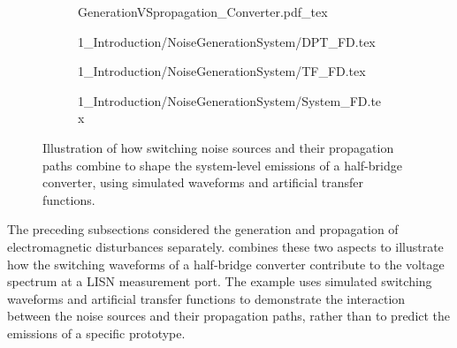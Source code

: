 \begin{figure}
	\begin{subfigure}[t]{0.48\textwidth}
		\centering
		\label{fig:SourceToSystem_TD}
	\end{subfigure}
	\hfill
    \begin{subfigure}[t]{0.48\textwidth}
		\centering
		{GenerationVSpropagation_Converter.pdf_tex}
		\label{fig:SourceToSystem_Circuit}
	\end{subfigure}

	\vspace{0.5cm}
	\begin{subfigure}[t]{0.48\textwidth}
		\centering
		{1_Introduction/NoiseGenerationSystem/DPT_FD.tex}
		\label{fig:SourceToSystem_Spectra}
	\end{subfigure}
	\hfill
	\begin{subfigure}[t]{0.48\textwidth}
		\centering
		{1_Introduction/NoiseGenerationSystem/TF_FD.tex}
		\label{fig:SourceToSystem_Transfer}
	\end{subfigure}
    
	\vspace{0.5cm}
    \begin{subfigure}[t]{0.98\textwidth}
		\centering
		{1_Introduction/NoiseGenerationSystem/System_FD.tex}
		\label{fig:SourceToSystem_LISN}
	\end{subfigure}
	\caption{Illustration of how switching noise sources and their propagation paths combine to shape the system-level emissions of a half-bridge converter, using simulated waveforms and artificial transfer functions.}
	\label{fig:SourceToSystem}
\end{figure}

The preceding subsections considered the generation and propagation of electromagnetic disturbances separately.
 combines these two aspects to illustrate how the switching waveforms of a half-bridge converter contribute to the voltage spectrum at a LISN measurement port.
The example uses simulated switching waveforms and artificial transfer functions to demonstrate the interaction between the noise sources and their propagation paths, rather than to predict the emissions of a specific prototype.



